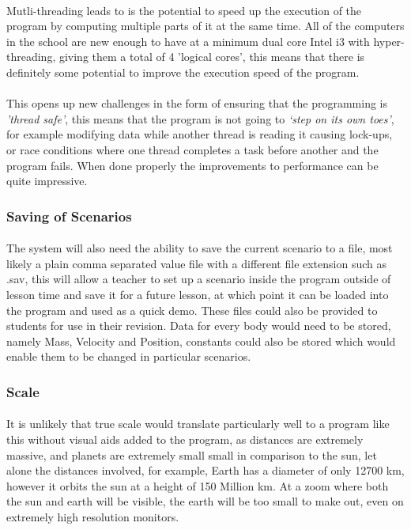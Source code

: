 \paragraph{}
Mutli-threading leads to is the potential to speed up the execution of the program by computing multiple parts of it at the same time. All of the computers in the school are new enough to have at a minimum dual core Intel i3 with hyper-threading, giving them a total of 4 'logical cores', this means that there is definitely some potential to improve the execution speed of the program.

\paragraph{} 
This opens up new challenges in the form of ensuring that the programming is \textit{'thread safe'}, this means that the program is not going to \textit{‘step on its own toes’}, for example modifying data while another thread is reading it causing lock-ups, or race conditions where one thread completes a task before another and the program fails. When done properly the improvements to performance can be quite impressive.

\subsubsection{Saving of Scenarios}

\paragraph{}
The system will also need the ability to save the current scenario to a file, most likely a plain comma separated value file with a different file extension such as .sav, this will allow a teacher to set up a scenario inside the program outside of lesson time and save it for a future lesson, at which point it can be loaded into the program and used as a quick demo. These files could also be provided to students for use in their revision. Data for every body would need to be stored, namely Mass, Velocity and Position, constants could also be stored which would enable them to be changed in particular scenarios.

\subsubsection{Scale}

\paragraph{}
It is unlikely that true scale would translate particularly well to a program like this without visual aids added to the program, as distances are extremely massive, and planets are extremely small small in comparison to the sun, let alone the distances involved, for example, Earth has a diameter of only 12700 km, however it orbits the sun at a height of 150 Million km. At a zoom where both the sun and earth will be visible, the earth will be too small to make out, even on extremely high resolution monitors.

